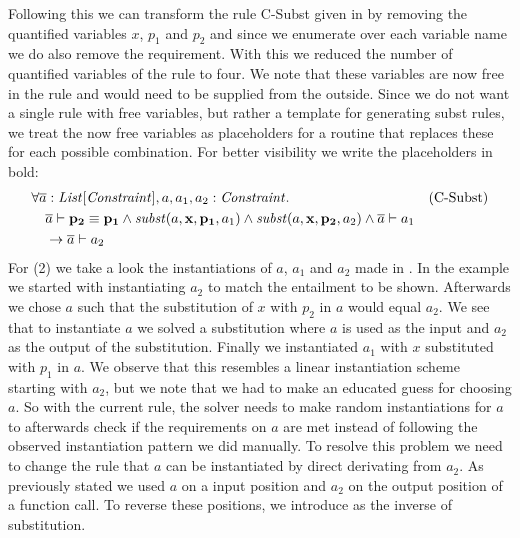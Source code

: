 Following this we can transform the rule C-Subst given in 
by removing the quantified variables $x$, $p_1$ and $p_2$
and since we enumerate over each variable name
we do also remove the  requirement.
With this we reduced the number of quantified variables
of the rule to four.
We note that these variables are now free in the rule
and would need to be supplied from the outside.
Since we do not want a single rule with free variables,
but rather a template for generating subst rules,
we treat the now free variables as placeholders for
a routine that replaces these for each possible combination.
For better visibility we write the placeholders in bold: %
\begin{align*}
&\forall \overline{a}: \mathit{List[\mathit{Constraint}]}, a, a_1, a_2: \mathit{Constraint}. && \text{(C-Subst)} \\
&\quad \overline{a} \vdash \mathit{\mathbf{p_2}} \equiv \mathit{\mathbf{p_1}}
         \land \mathit{subst}(a, \mathbf{x}, \mathbf{p_1}, a_1) \land \mathit{subst}(a, \mathbf{x}, \mathbf{p_2}, a_2)
       \land \overline{a} \vdash a_1\\
&\quad \rightarrow \overline{a} \vdash a_2
\end{align*}
%
For (2) we take a look the instantiations of $a$, $a_1$ and $a_2$
made in .
In the example we started with instantiating $a_2$ to match
the entailment to be shown.
Afterwards we chose $a$ such that the substitution of
$x$ with $p_2$ in $a$ would equal $a_2$.
We see that to instantiate $a$ we solved a substitution
where $a$ is used as the input and $a_2$ as the output of the substitution.
Finally we instantiated $a_1$ with $x$ substituted with $p_1$ in $a$.
We observe that this resembles a linear instantiation scheme starting with $a_2$,
but we note that we had to make an educated guess for choosing $a$.
So with the current rule, the solver needs to make random instantiations
for $a$ to afterwards check if the requirements on $a$ are met
instead of following the observed instantiation pattern we did manually.
To resolve this problem we need to change the rule that $a$ can be
instantiated by direct derivating from $a_2$.
As previously stated we used $a$ on a input position
and $a_2$ on the output position of a function call.
To reverse these positions, we introduce  as
the inverse of substitution.
